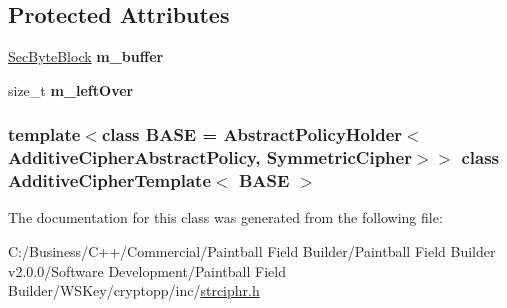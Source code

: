 \subsection*{Protected Attributes}
\begin{DoxyCompactItemize}
\item 
\hypertarget{class_additive_cipher_template_adc071d835c1113d83a98ca62b09f0904}{
\hyperlink{class_sec_block}{SecByteBlock} {\bfseries m\_\-buffer}}
\label{class_additive_cipher_template_adc071d835c1113d83a98ca62b09f0904}

\item 
\hypertarget{class_additive_cipher_template_a0c2f1c9e2245bff40739170769ea39c4}{
size\_\-t {\bfseries m\_\-leftOver}}
\label{class_additive_cipher_template_a0c2f1c9e2245bff40739170769ea39c4}

\end{DoxyCompactItemize}
\subsubsection*{template$<$class BASE = AbstractPolicyHolder$<$AdditiveCipherAbstractPolicy, SymmetricCipher$>$$>$ class AdditiveCipherTemplate$<$ BASE $>$}



The documentation for this class was generated from the following file:\begin{DoxyCompactItemize}
\item 
C:/Business/C++/Commercial/Paintball Field Builder/Paintball Field Builder v2.0.0/Software Development/Paintball Field Builder/WSKey/cryptopp/inc/\hyperlink{strciphr_8h}{strciphr.h}\end{DoxyCompactItemize}
